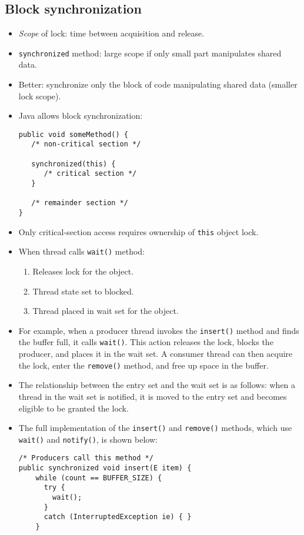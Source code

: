 \subsection{Block synchronization}
\begin{itemize}
    \item \textit{Scope} of lock: time between acquisition and release.
    \item \texttt{synchronized} method: large scope if only small part manipulates shared data.
    \item Better: synchronize only the block of code manipulating shared data (smaller lock scope).
    \item Java allows block synchronization:
    \begin{verbatim}
public void someMethod() {
   /* non-critical section */
 
   synchronized(this) {
      /* critical section */
   }
 
   /* remainder section */
}
    \end{verbatim}
    \item Only critical-section access requires ownership of \texttt{this} object lock.
    \item When thread calls \texttt{wait()} method:
    \begin{enumerate}
        \item Releases lock for the object.
        \item Thread state set to blocked.
        \item Thread placed in wait set for the object.
    \end{enumerate}
    \item For example, when a producer thread invokes the \texttt{insert()} method and finds the buffer full, it calls \texttt{wait()}. This action releases the lock, blocks the producer, and places it in the wait set. A consumer thread can then acquire the lock, enter the \texttt{remove()} method, and free up space in the buffer.
    \item The relationship between the entry set and the wait set is as follows: when a thread in the wait set is notified, it is moved to the entry set and becomes eligible to be granted the lock.
    \item The full implementation of the \texttt{insert()} and \texttt{remove()} methods, which use \texttt{wait()} and \texttt{notify()}, is shown below:
    \begin{verbatim}
/* Producers call this method */
public synchronized void insert(E item) {
    while (count == BUFFER_SIZE) {
      try {
        wait();
      }
      catch (InterruptedException ie) { }
    }
 

\end{verbatim}
\end{itemize}
